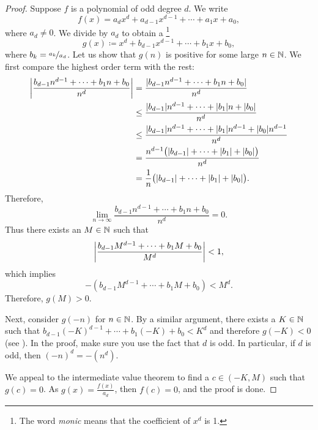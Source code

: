 \begin{proof}
Suppose $f$ is a polynomial of odd degree $d$.  We write
\begin{equation*}
f(x) = a_d x^d + a_{d-1} x^{d-1} + \cdots + a_1 x + a_0 ,
\end{equation*}
where $a_d \neq 0$.  We divide by $a_d$ to obtain a 
\emph{}\footnote{The word \emph{monic} means that
the coefficient of $x^d$ is 1.}
\begin{equation*}
g(x) \coloneqq x^d + b_{d-1} x^{d-1} + \cdots + b_1 x + b_0 ,
\end{equation*}
where $b_k = \nicefrac{a_k}{a_d}$.
Let us show that $g(n)$ is
positive for some large $n \in {\mathbb{N}}$.
We first compare the highest order term with the rest:
\begin{equation*}
\begin{split}
\left\lvert {\frac{b_{d-1} n^{d-1} + \cdots + b_1 n + b_0}{n^d}} \right\rvert
& =
\frac{\lvert {b_{d-1} n^{d-1} + \cdots + b_1 n + b_0} \rvert}{n^d}
\\
& \leq
\frac{\lvert {b_{d-1}} \rvert n^{d-1} + \cdots + \lvert {b_1} \rvert n + \lvert {b_0} \rvert}{n^d}
\\
& \leq
\frac{\lvert {b_{d-1}} \rvert n^{d-1} + \cdots + \lvert {b_1} \rvert n^{d-1} + \lvert {b_0} \rvert n^{d-1}}{n^d}
\\
& =
\frac{n^{d-1}\bigl(\lvert {b_{d-1}} \rvert + \cdots + \lvert {b_1} \rvert + \lvert {b_0} \rvert\bigr)}{n^d}
\\
& =
\frac{1}{n}
\bigl(\lvert {b_{d-1}} \rvert + \cdots + \lvert {b_1} \rvert + \lvert {b_0} \rvert\bigr) .
\end{split}
\end{equation*}
Therefore,
\begin{equation*}
\lim_{n\to\infty} \frac{b_{d-1} n^{d-1} + \cdots + b_1 n + b_0}{n^d}
= 0 .
\end{equation*}
Thus there exists an $M \in {\mathbb{N}}$ such that 
\begin{equation*}
\left\lvert {\frac{b_{d-1} M^{d-1} + \cdots + b_1 M + b_0}{M^d}} \right\rvert < 1 ,
\end{equation*}
which implies
\begin{equation*}
-(b_{d-1} M^{d-1} + \cdots + b_1 M + b_0) < M^d .
\end{equation*}
Therefore, $g(M) > 0$.

Next, consider $g(-n)$ for $n \in {\mathbb{N}}$.  By a similar argument,
there exists a $K \in {\mathbb{N}}$ such that
$b_{d-1} {(-K)}^{d-1} + \cdots + b_1 (-K) + b_0 < K^d$
and therefore $g(-K) < 0$ (see ).
In the proof,
 make sure you use the fact that $d$ is odd.
In particular, if $d$ is odd, then ${(-n)}^d = -(n^d)$.

We appeal to the intermediate value theorem to find a
$c \in (-K,M)$ such that $g(c) = 0$.  As $g(x) = \frac{f(x)}{a_d}$,
then $f(c) = 0$, and the proof is done.
\end{proof}

